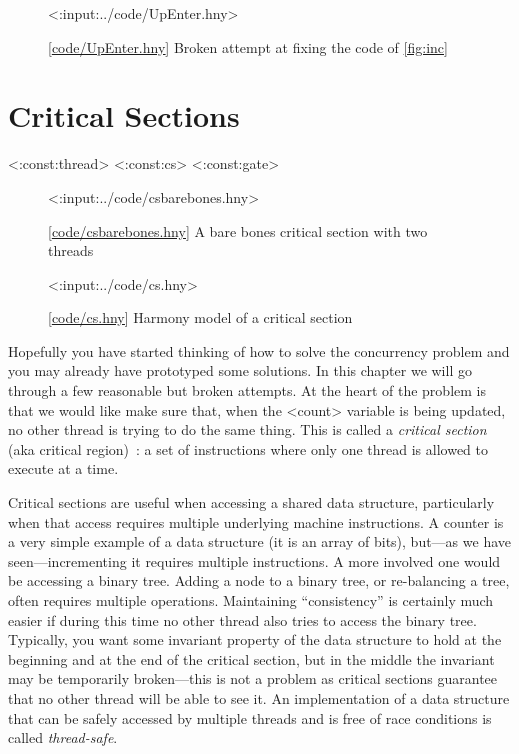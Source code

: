 \documentclass{report}
\newcommand{\harmonylink}[1]{%
[\href{https://harmony.cs.cornell.edu/#1}{\underline{#1}}]%
}
\newenvironment{code}{
\tcolorbox
}{
\endtcolorbox
}
\begin{document}
\begin{figure}
\begin{code}
<{:input:../code/UpEnter.hny}>
\end{code}
\caption{\harmonylink{code/UpEnter.hny} Broken attempt at fixing the code of \autoref{fig:inc}}
\label{fig:incenter}
\end{figure}

\chapter{Critical Sections}
\label{ch:critical}

<{:const:thread}>
<{:const:cs}>
<{:const:gate}>

\begin{figure}
\begin{code}
<{:input:../code/csbarebones.hny}>
\end{code}
\caption{\harmonylink{code/csbarebones.hny} A bare bones critical section with two threads}
\label{fig:csbarebones}
\end{figure}

\begin{figure}
\begin{code}
<{:input:../code/cs.hny}>
\end{code}
\caption{\harmonylink{code/cs.hny} Harmony model of a critical section}
\label{fig:cs}
\end{figure}

Hopefully you have started thinking of how to solve the concurrency
problem and you may already have prototyped some solutions.
In this chapter we will go through a few reasonable but broken attempts.
At the heart of the problem is that we would like make sure that, when
the <{count}> variable is being updated, no other thread is
trying to do the same thing.  This is called a \emph{critical section}
(aka critical region)~\cite{EWD123}:
a set of instructions where only one thread is allowed to execute at a
time.
%
%

%
%

Critical sections are useful when accessing a shared data
structure, particularly when that access requires multiple underlying
machine instructions.  A counter is a very simple example of
a data structure (it is an array of bits), but---as we have
seen---incrementing it requires multiple instructions.
A more involved one would be accessing a binary tree.
Adding a node to a binary tree, or re-balancing a tree, often requires
multiple operations.  Maintaining ``consistency'' is certainly much easier
if during this time no other
thread also tries to access the binary tree.
Typically, you want some invariant property of the data structure to hold
at the beginning and at the end of the critical section, but in the middle
the invariant may be temporarily broken---this is not a problem as critical
sections guarantee that no other
thread will be able to see it.
An implementation of a data structure that can be safely accessed by multiple
threads and is free of race conditions is called \emph{thread-safe}.
%
%
\end{document}
